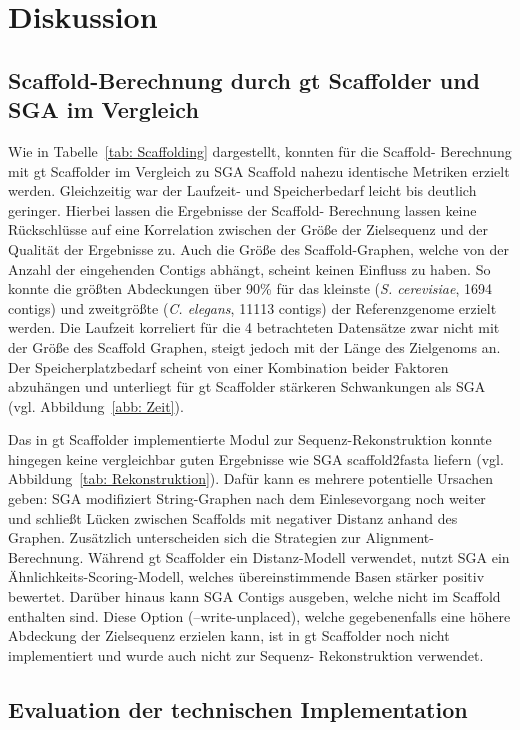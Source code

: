 \documentclass[a4paper,11pt,parskip]{scrartcl}
\begin{document}
\section{Diskussion}
\label{sec: Diskussion}

\subsection{Scaffold-Berechnung durch gt Scaffolder und SGA im Vergleich}

Wie in Tabelle~\ref{tab: Scaffolding} dargestellt, konnten für die Scaffold-
Berechnung mit gt Scaffolder im Vergleich zu SGA Scaffold nahezu identische
Metriken erzielt werden. Gleichzeitig war der Laufzeit- und Speicherbedarf
leicht bis deutlich geringer.
Hierbei lassen die Ergebnisse der Scaffold- Berechnung lassen keine
Rückschlüsse auf eine Korrelation zwischen der Größe der Zielsequenz und der
Qualität der Ergebnisse zu. Auch die Größe des Scaffold-Graphen, welche von
der Anzahl der eingehenden Contigs abhängt, scheint keinen Einfluss zu haben.
So konnte die größten Abdeckungen über 90\% für das kleinste (\textit{S.
cerevisiae}, 1694 contigs) und zweitgrößte (\textit{C. elegans}, 11113
contigs) der Referenzgenome erzielt werden.
Die Laufzeit korreliert für die 4 betrachteten Datensätze zwar nicht mit der
Größe des Scaffold Graphen, steigt jedoch mit der Länge des Zielgenoms an. Der
Speicherplatzbedarf scheint von einer Kombination beider Faktoren abzuhängen
und unterliegt für gt Scaffolder stärkeren Schwankungen als SGA (vgl.
Abbildung~\ref{abb: Zeit}).

Das in gt Scaffolder implementierte Modul zur Sequenz-Rekonstruktion konnte
hingegen keine vergleichbar guten Ergebnisse wie SGA scaffold2fasta liefern
(vgl. Abbildung~\ref{tab: Rekonstruktion}). Dafür kann es mehrere potentielle
Ursachen geben: SGA modifiziert String-Graphen nach dem Einlesevorgang noch
weiter und schließt Lücken zwischen Scaffolds mit negativer Distanz anhand des
Graphen. Zusätzlich unterscheiden sich die Strategien zur Alignment-
Berechnung. Während gt Scaffolder ein Distanz-Modell verwendet, nutzt SGA ein
Ähnlichkeits-Scoring-Modell, welches übereinstimmende Basen stärker positiv
bewertet. Darüber hinaus kann SGA Contigs ausgeben, welche nicht im Scaffold
enthalten sind. Diese Option (--write-unplaced), welche gegebenenfalls eine
höhere Abdeckung der Zielsequenz erzielen kann, ist in gt Scaffolder noch
nicht implementiert und wurde auch nicht zur Sequenz- Rekonstruktion
verwendet.

\subsection{Evaluation der technischen Implementation}
\end{document}
